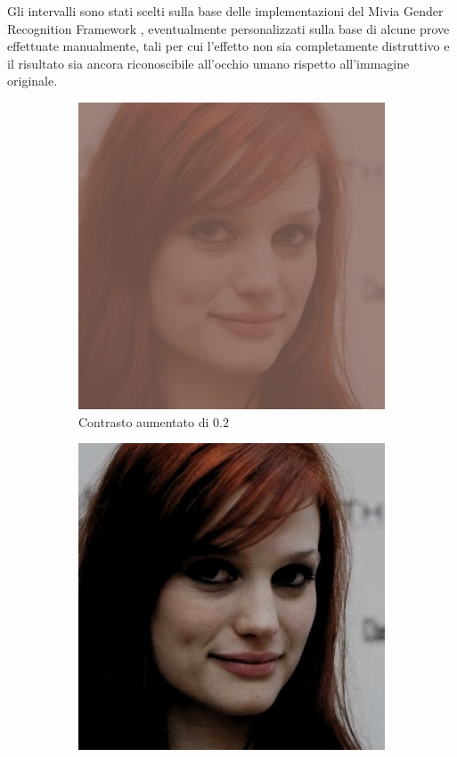 Gli intervalli sono stati scelti sulla base delle implementazioni del Mivia Gender Recognition Framework \cite{miviagender}, eventualmente personalizzati sulla base di alcune prove effettuate manualmente, tali per cui l'effetto non sia completamente distruttivo e il risultato sia ancora riconoscibile all'occhio umano rispetto all'immagine originale.

\begin{figure}[h]
\begin{subfigure}{0.2\textwidth}
\includegraphics[width=\textwidth]{./Images/contrast_severity_0.2.jpg}
\caption{Contrasto aumentato di $0.2$}
\label{sfig:corruption_contrast}
\end{subfigure}\hfill
\begin{subfigure}{0.2\textwidth}
\includegraphics[width=\textwidth]{./Images/brightness_severity_-0.3.jpg}

\end{subfigure}
\end{figure}

